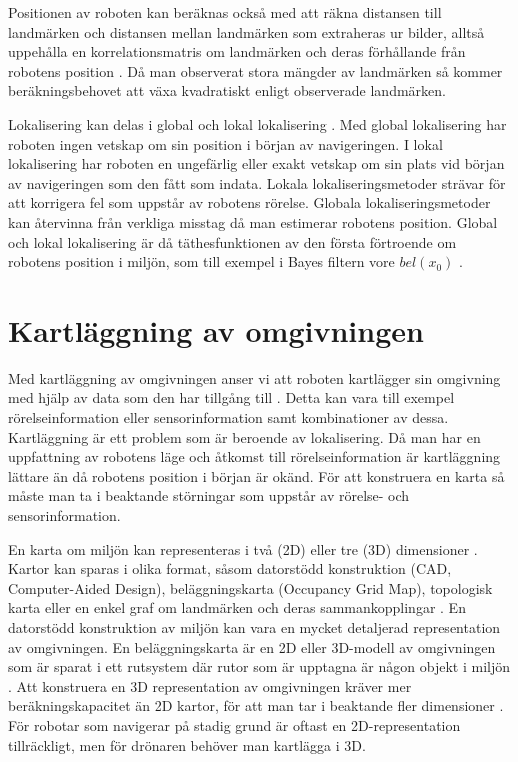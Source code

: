 Positionen av roboten kan beräknas också med att räkna distansen till landmärken och distansen mellan landmärken som extraheras ur bilder, alltså uppehålla en korrelationsmatris om landmärken och deras förhållande från robotens position \citep{realslamproblem, ProbabilisticRobotics}. Då man observerat stora mängder av landmärken så kommer beräkningsbehovet att växa kvadratiskt enligt observerade landmärken. 

Lokalisering kan delas i global och lokal lokalisering \citep{982903, globalsubmaps}. Med global lokalisering har roboten ingen vetskap om sin position i början av navigeringen. I lokal lokalisering har roboten en ungefärlig eller exakt vetskap om sin plats vid början av navigeringen som den fått som indata. Lokala lokaliseringsmetoder strävar för att korrigera fel som uppstår av robotens rörelse. Globala lokaliseringsmetoder kan återvinna från verkliga misstag då man estimerar robotens position. Global och lokal lokalisering är då täthesfunktionen av den första förtroende om robotens position i miljön, som till exempel i Bayes filtern vore $bel(x_0)$ \citep{ProbabilisticRobotics}.

\section{Kartläggning av omgivningen}

Med kartläggning av omgivningen anser vi att roboten kartlägger sin omgivning med hjälp av data som den har tillgång till \citep{ProbabilisticRobotics}. Detta kan vara till exempel rörelseinformation eller sensorinformation samt kombinationer av dessa. Kartläggning är ett problem som är beroende av lokalisering. Då man har en uppfattning av robotens läge och åtkomst till rörelseinformation är kartläggning lättare än då robotens position i början är okänd. För att konstruera en karta så måste man ta i beaktande störningar som uppstår av rörelse- och sensorinformation.

En karta om miljön kan representeras i två (2D) eller tre (3D) dimensioner \citep{geospatial}. Kartor kan sparas i olika format, såsom datorstödd konstruktion (CAD, Computer-Aided Design), beläggningskarta (Occupancy Grid Map), topologisk karta eller en enkel graf om landmärken och deras sammankopplingar \citep{982903}. En datorstödd konstruktion av miljön kan vara en mycket detaljerad representation av omgivningen. En beläggningskarta är en 2D eller 3D-modell av omgivningen som är sparat i ett rutsystem där rutor som är upptagna är någon objekt i miljön \citep{6095058, 982903}. Att konstruera en 3D representation av omgivningen kräver mer beräkningskapacitet än 2D kartor, för att man tar i beaktande fler dimensioner \citep{ProbabilisticRobotics}. För robotar som navigerar på stadig grund är oftast en 2D-representation tillräckligt, men för drönaren behöver man kartlägga i 3D.

